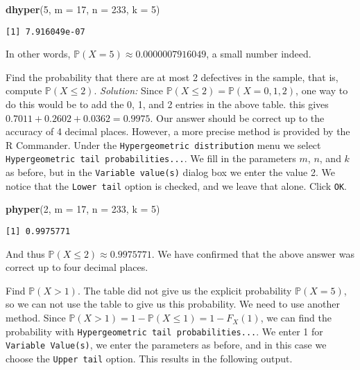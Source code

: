 \documentclass[]{book}
\newenvironment{Shaded}{\begin{snugshade}}{\end{snugshade}}
\newcommand{\KeywordTok}[1]{\textcolor[rgb]{0.13,0.29,0.53}{\textbf{{#1}}}}
\newcommand{\DataTypeTok}[1]{\textcolor[rgb]{0.13,0.29,0.53}{{#1}}}
\newcommand{\DecValTok}[1]{\textcolor[rgb]{0.00,0.00,0.81}{{#1}}}
\newcommand{\NormalTok}[1]{{#1}}
\numberwithin{equation}{chapter}
\numberwithin{figure}{chapter}
\theoremstyle{plain}
\theoremstyle{definition}
\theoremstyle{remark}
\theoremstyle{definition}
\theoremstyle{definition}
\theoremstyle{remark}
\begin{document}
\begin{Shaded}
\begin{Highlighting}[]
\KeywordTok{dhyper}\NormalTok{(}\DecValTok{5}\NormalTok{, }\DataTypeTok{m =} \DecValTok{17}\NormalTok{, }\DataTypeTok{n =} \DecValTok{233}\NormalTok{, }\DataTypeTok{k =} \DecValTok{5}\NormalTok{)}
\end{Highlighting}
\end{Shaded}

\begin{verbatim}
[1] 7.916049e-07
\end{verbatim}

In other words, \(\mathbb{P}(X=5)\approx0.0000007916049\), a small
number indeed.

Find the probability that there are at most 2 defectives in the sample,
that is, compute \(\mathbb{P}(X\leq2)\). \emph{Solution:} Since
\(\mathbb{P}(X\leq2)=\mathbb{P}(X=0,1,2)\), one way to do this would be
to add the 0, 1, and 2 entries in the above table. this gives
\(0.7011+0.2602+0.0362=0.9975\). Our answer should be correct up to the
accuracy of 4 decimal places. However, a more precise method is provided
by the R Commander. Under the \texttt{Hypergeometric\ distribution} menu
we select \texttt{Hypergeometric\ tail\ probabilities...}. We fill in
the parameters \(m\), \(n\), and \(k\) as before, but in the
\texttt{Variable\ value(s)} dialog box we enter the value 2. We notice
that the \texttt{Lower\ tail} option is checked, and we leave that
alone. Click \texttt{OK}.

\begin{Shaded}
\begin{Highlighting}[]
\KeywordTok{phyper}\NormalTok{(}\DecValTok{2}\NormalTok{, }\DataTypeTok{m =} \DecValTok{17}\NormalTok{, }\DataTypeTok{n =} \DecValTok{233}\NormalTok{, }\DataTypeTok{k =} \DecValTok{5}\NormalTok{)}
\end{Highlighting}
\end{Shaded}

\begin{verbatim}
[1] 0.9975771
\end{verbatim}

And thus \(\mathbb{P}(X\leq2)\approx 0.9975771\). We have confirmed that
the above answer was correct up to four decimal places.

Find \(\mathbb{P}(X>1)\). The table did not give us the explicit
probability \(\mathbb{P}(X=5)\), so we can not use the table to give us
this probability. We need to use another method. Since
\(\mathbb{P}(X>1)=1-\mathbb{P}(X\leq1)=1-F_{X}(1)\), we can find the
probability with \texttt{Hypergeometric\ tail\ probabilities...}. We
enter 1 for \texttt{Variable\ Value(s)}, we enter the parameters as
before, and in this case we choose the \texttt{Upper\ tail} option. This
results in the following output.
\end{document}
